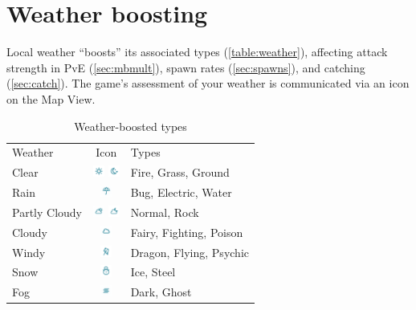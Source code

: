 \section{Weather boosting}
\label{sec:weather}
Local weather ``boosts'' its associated types (\autoref{table:weather}), affecting attack strength
 in PvE (\autoref{sec:mbmult}),
 spawn rates (\autoref{sec:spawns}), and catching (\autoref{sec:catch}).
The game's assessment of your weather is communicated via an icon on the Map View.
\begin{table}[ht]
\begin{center}
  \begin{tabular}{lcl}
    Weather & Icon & Types \\
    \Midrule
    Clear &
     \includegraphics[width=1em,height=1em]{images/weatherclearday.png}
     \includegraphics[width=1em,height=1em]{images/weatherclearnight.png}
     & Fire, Grass, Ground \\
    Rain &
     \includegraphics[width=1em,height=1em]{images/weatherrain.png}
     & Bug, Electric, Water \\
    Partly Cloudy &
     \includegraphics[width=1em,height=1em]{images/weatherpartlycloudyday.png}
     \includegraphics[width=1em,height=1em]{images/weatherpartlycloudynight.png}
     & Normal, Rock \\
    Cloudy &
     \includegraphics[width=1em,height=1em]{images/weathercloudy.png}
     & Fairy, Fighting, Poison \\
    Windy &
     \includegraphics[width=1em,height=1em]{images/weatherwindy.png}
     & Dragon, Flying, Psychic \\
    Snow &
     \includegraphics[width=1em,height=1em]{images/weathersnow.png}
     & Ice, Steel \\
    Fog &
     \includegraphics[width=1em,height=1em]{images/weatherfoggy.png}
     & Dark, Ghost \\
  \end{tabular}
  \caption{Weather-boosted types}
  \label{table:weather}
\end{center}
\end{table}
